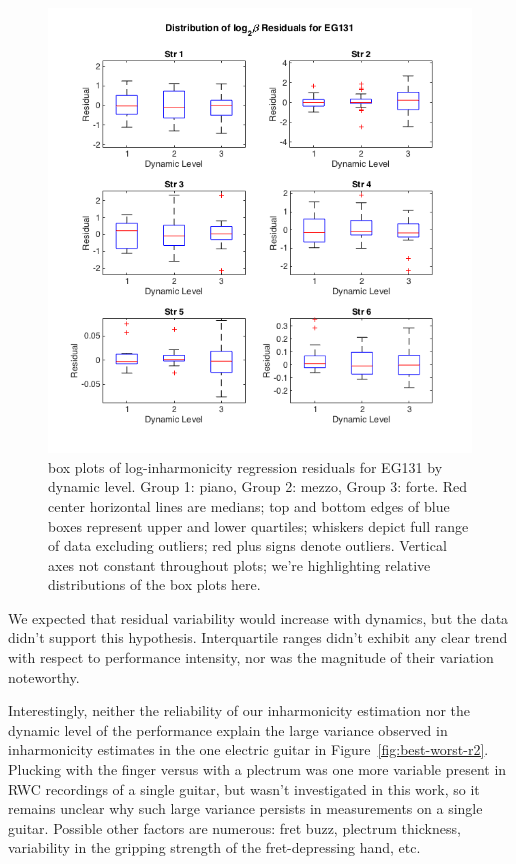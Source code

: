 \documentclass[12pt]{cmuthesis}
\begin{document}
\begin{figure}[!htbp] 
\centering
\includegraphics[scale=0.75]{eg1-string-dyn}
\caption{box plots of log-inharmonicity regression residuals for EG131 by dynamic level. Group 1: piano, Group 2: mezzo, Group 3: forte. Red center horizontal lines are medians; top and bottom edges of blue boxes represent upper and lower quartiles; whiskers depict full range of data excluding outliers; red plus signs denote outliers. Vertical axes not constant throughout plots; we're highlighting relative distributions of the box plots here.}
\label{fig:eg1-string-dyn}
\end{figure} 
We expected that residual variability would increase with dynamics, but the data didn't support this hypothesis. Interquartile ranges didn't exhibit any clear trend with respect to performance intensity, nor was the magnitude of their variation noteworthy. 

Interestingly, neither the reliability of our inharmonicity estimation nor the dynamic level of the performance explain the large variance observed in inharmonicity estimates in the one electric guitar in Figure~\ref{fig:best-worst-r2}. Plucking with the finger versus with a plectrum was one more variable present in RWC recordings of a single guitar, but wasn't investigated in this work, so it remains unclear why such large variance persists in measurements on a single guitar. Possible other factors are numerous: fret buzz, plectrum thickness, variability in the gripping strength of the fret-depressing hand, etc.
\end{document}
